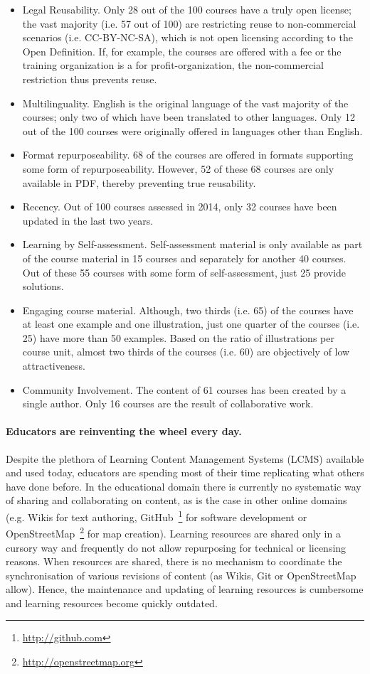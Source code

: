 \documentclass[ngerman,UKenglish,table]{scrbook}
\begin{document}
\begin{itemize}
\item{Legal Reusability.} Only 28 out of the 100 courses have a truly open license; the vast majority (i.e. 57 out of 100) are restricting reuse to non-commercial scenarios (i.e. CC-BY-NC-SA), which is not open licensing according to the Open Definition.
If, for example, the courses are offered with a fee or the training organization is a for profit-organization, the non-commercial restriction thus prevents reuse.
\item{Multilinguality.} English is the original language of the vast majority of the courses; only two of which have been translated to other languages.
Only 12 out of the 100 courses were originally offered in languages other than English. 
\item{Format repurposeability.} 68 of the courses are offered in formats supporting some form of repurposeability. However, 52 of these 68 courses are only available in PDF, thereby preventing true reusability.
\item{Recency.} Out of 100 courses assessed in 2014, only 32 courses have been updated in the last two years.
\item{Learning by Self-assessment.} Self-assessment material is only available as part of the course material in 15 courses and separately for another 40 courses.
Out of these 55 courses with some form of self-assessment, just 25 provide solutions.
\item{Engaging course material.} Although, two thirds (i.e. 65) of the courses have at least one example and one illustration, just one quarter of the courses (i.e. 25) have more than 50 examples.
Based on the ratio of illustrations per course unit, almost two thirds of the courses (i.e. 60) are objectively of low attractiveness.
\item{Community Involvement.} The content of 61 courses has been created by a single author. Only 16 courses are the result of collaborative work.
\end{itemize}

\paragraph{Educators are reinventing the wheel every day.}
Despite the plethora of Learning Content Management Systems (LCMS) available and used today, educators are spending most of their time replicating what others have done before.
In the educational domain there is currently no systematic way of sharing and collaborating on content, as is the case in other online domains (e.g. Wikis for text authoring, GitHub~\footnote{\url{http://github.com}} for software development or OpenStreetMap~\footnote{\url{http://openstreetmap.org}} for map creation).
Learning resources are shared only in a cursory way and frequently do not allow repurposing for technical or licensing reasons.
When resources are shared, there is no mechanism to coordinate the synchronisation of various revisions of content (as Wikis, Git or OpenStreetMap allow).
Hence, the maintenance and updating of learning resources is cumbersome and learning resources become quickly outdated.
\end{document}
